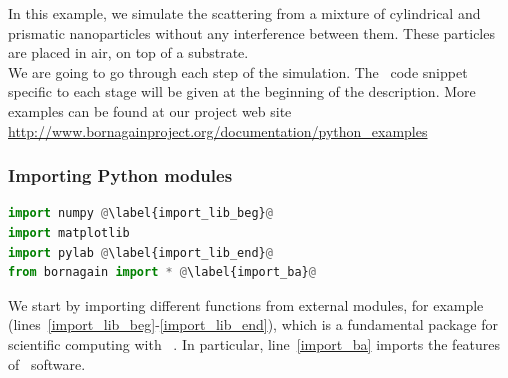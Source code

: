  



In this example, we simulate the scattering from a mixture of
cylindrical and prismatic nanoparticles without any interference
between them. These particles are placed in air, on top
of a substrate.\\ We are going to go through each step of the
simulation. The \Python\ code snippet specific to each stage will be given at
the beginning of the description. 
More examples can be found at our project web site \url{http://www.bornagainproject.org/documentation/python_examples}



%
\subsubsection{Importing Python modules}
\begin{lstlisting}[language=python, style=eclipseboxed,name=ex1,nolol]
import numpy @\label{import_lib_beg}@
import matplotlib
import pylab @\label{import_lib_end}@
from bornagain import * @\label{import_ba}@
\end{lstlisting}
We start by importing different functions from external
modules, for example  (lines~\ref{import_lib_beg}-\ref{import_lib_end}), which
is a fundamental package for scientific computing with \Python\
\cite{s:numpy}.  In particular, line~\ref{import_ba}
imports the features of \BornAgain\ software.


%

